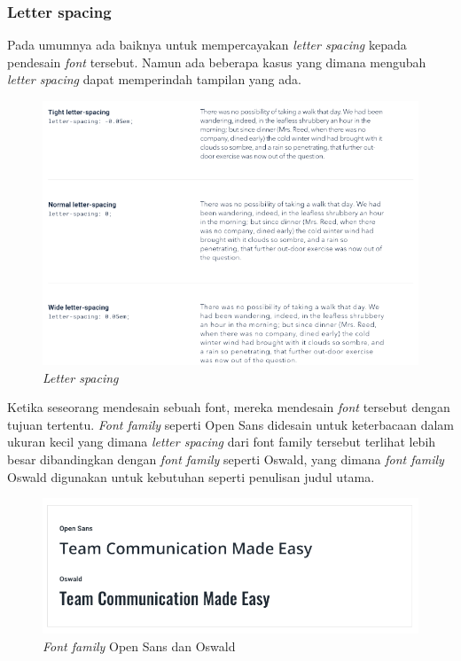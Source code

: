 \subsubsection{Letter spacing}
Pada umumnya ada baiknya untuk mempercayakan \textit{letter spacing} kepada pendesain \textit{font} tersebut. Namun ada beberapa kasus yang dimana mengubah \textit{letter spacing} dapat memperindah tampilan yang ada.
 \begin{figure}[H]
	{\centering
		\includegraphics[keepaspectratio, width=12cm]{gambar/refactoring-ui-g21.png}
		\caption{\textit{Letter spacing} \citep{refactoringui}}}
	\label{gambar:refactoring-ui-g21.png}
\end{figure}
Ketika seseorang mendesain sebuah font, mereka mendesain \textit{font} tersebut dengan tujuan tertentu. \textit{Font family} seperti Open Sans didesain untuk keterbacaan dalam ukuran kecil yang dimana \textit{letter spacing} dari font family tersebut terlihat lebih besar dibandingkan dengan \textit{font family} seperti Oswald, yang dimana \textit{font family} Oswald digunakan untuk kebutuhan seperti penulisan judul utama.

\begin{figure}[H]
	{\centering
		\includegraphics[keepaspectratio, width=12cm]{gambar/refactoring-ui-g22.png}
		\caption{\textit{Font family} Open Sans dan Oswald \citep{refactoringui}} }
	\label{gambar:refactoring-ui-g22.png}
\end{figure}


